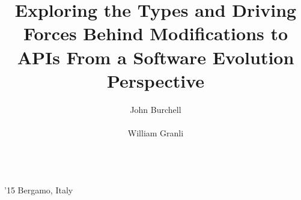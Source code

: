 \documentclass{sig-alternate}
\begin{document}
 {'15 Bergamo, Italy}



\title{Exploring the Types and Driving Forces Behind Modifications to APIs From a Software Evolution Perspective}



\author{
\alignauthor
John Burchell\\
       \\
\alignauthor
William Granli\\
       \\
}

\maketitle
\end{document}
